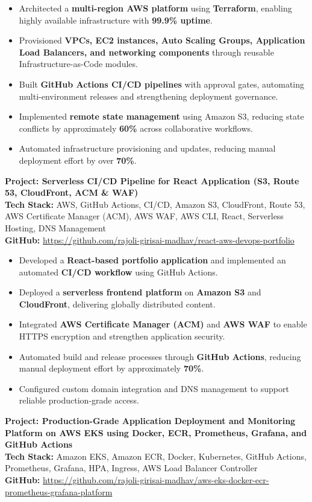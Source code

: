 \documentclass[letterpaper,11pt]{article}
\newcommand{\resumeItem}[1]{
  \item\small{
    {#1 \vspace{-1pt}}
  }
}
\newcommand{\resumeItemListStart}{\begin{itemize}[leftmargin=0.15in, itemsep=1pt, parsep=0pt, topsep=0pt]}
\newcommand{\resumeItemListEnd}{\end{itemize}\vspace{2pt}}
\begin{document}
      \resumeItemListStart
        \resumeItem{Architected a \textbf{multi-region AWS platform} using \textbf{Terraform}, enabling highly available infrastructure with \textbf{99.9\% uptime}.}
        \resumeItem{Provisioned \textbf{VPCs, EC2 instances, Auto Scaling Groups, Application Load Balancers, and networking components} through reusable Infrastructure-as-Code modules.}
        \resumeItem{Built \textbf{GitHub Actions CI/CD pipelines} with approval gates, automating multi-environment releases and strengthening deployment governance.}
        \resumeItem{Implemented \textbf{remote state management} using Amazon S3, reducing state conflicts by approximately \textbf{60\%} across collaborative workflows.}
        \resumeItem{Automated infrastructure provisioning and updates, reducing manual deployment effort by over \textbf{70\%}.}
      \resumeItemListEnd

      \vspace{1pt}
      \noindent\textbf{Project: Serverless CI/CD Pipeline for React Application (S3, Route 53, CloudFront, ACM \& WAF)} \\
      \small{\textbf{Tech Stack:} AWS, GitHub Actions, CI/CD, Amazon S3, CloudFront, Route 53, AWS Certificate Manager (ACM), AWS WAF, AWS CLI, React, Serverless Hosting, DNS Management} \\
      \small{\textbf{GitHub:} \href{https://github.com/rajoli-girisai-madhav/react-aws-devops-portfolio}{https://github.com/rajoli-girisai-madhav/react-aws-devops-portfolio}}
      
      \resumeItemListStart
        \resumeItem{Developed a \textbf{React-based portfolio application} and implemented an automated \textbf{CI/CD workflow} using GitHub Actions.}
        \resumeItem{Deployed a \textbf{serverless frontend platform} on \textbf{Amazon S3} and \textbf{CloudFront}, delivering globally distributed content.}
        \resumeItem{Integrated \textbf{AWS Certificate Manager (ACM)} and \textbf{AWS WAF} to enable HTTPS encryption and strengthen application security.}
        \resumeItem{Automated build and release processes through \textbf{GitHub Actions}, reducing manual deployment effort by approximately \textbf{70\%}.}
        \resumeItem{Configured custom domain integration and DNS management to support reliable production-grade access.}
      \resumeItemListEnd

      
      \vspace{1pt}
      \noindent\textbf{Project: Production-Grade Application Deployment and Monitoring Platform on AWS EKS using Docker, ECR, Prometheus, Grafana, and GitHub Actions} \\
      \small{\textbf{Tech Stack:} Amazon EKS, Amazon ECR, Docker, Kubernetes, GitHub Actions, Prometheus, Grafana, HPA, Ingress, AWS Load Balancer Controller} \\
      \small{\textbf{GitHub:} \href{https://github.com/your-repository}{https://github.com/rajoli-girisai-madhav/aws-eks-docker-ecr-prometheus-grafana-platform}}
      
\end{document}
